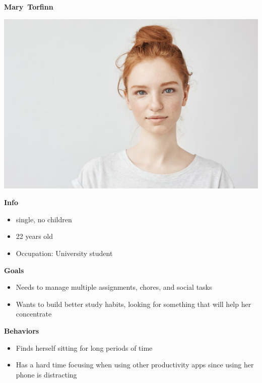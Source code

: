 \textbf{Mary~Torfinn}

\includegraphics{../common/personas/res/Mary.jpg}

\textbf{Info}
\begin{itemize}
  \item single, no children
  \item 22 years old
  \item Occupation: University student 
\end{itemize}

\textbf{Goals}
\begin{itemize}
  \item Needs to manage multiple assignments, chores, and social tasks
  \item Wants to build better study habits, looking for something that will help her concentrate
\end{itemize}

\textbf{Behaviors}
\begin{itemize}
  \item Finds herself sitting for long periods of time
  \item Has a hard time focusing when using other productivity apps since using her phone is distracting
\end{itemize}

